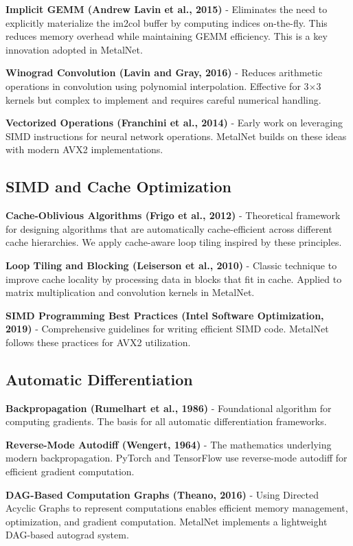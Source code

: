 \documentclass[12pt,oneside,a4paper]{report}
\begin{document}
\textbf{Implicit GEMM (Andrew Lavin et al., 2015)} - Eliminates the need to explicitly materialize the im2col buffer by computing indices on-the-fly. This reduces memory overhead while maintaining GEMM efficiency. This is a key innovation adopted in MetalNet.

\textbf{Winograd Convolution (Lavin and Gray, 2016)} - Reduces arithmetic operations in convolution using polynomial interpolation. Effective for 3$\times$3 kernels but complex to implement and requires careful numerical handling.

\textbf{Vectorized Operations (Franchini et al., 2014)} - Early work on leveraging SIMD instructions for neural network operations. MetalNet builds on these ideas with modern AVX2 implementations.

\subsection{SIMD and Cache Optimization}

\textbf{Cache-Oblivious Algorithms (Frigo et al., 2012)} - Theoretical framework for designing algorithms that are automatically cache-efficient across different cache hierarchies. We apply cache-aware loop tiling inspired by these principles.

\textbf{Loop Tiling and Blocking (Leiserson et al., 2010)} - Classic technique to improve cache locality by processing data in blocks that fit in cache. Applied to matrix multiplication and convolution kernels in MetalNet.

\textbf{SIMD Programming Best Practices (Intel Software Optimization, 2019)} - Comprehensive guidelines for writing efficient SIMD code. MetalNet follows these practices for AVX2 utilization.

\subsection{Automatic Differentiation}

\textbf{Backpropagation (Rumelhart et al., 1986)} - Foundational algorithm for computing gradients. The basis for all automatic differentiation frameworks.

\textbf{Reverse-Mode Autodiff (Wengert, 1964)} - The mathematics underlying modern backpropagation. PyTorch and TensorFlow use reverse-mode autodiff for efficient gradient computation.

\textbf{DAG-Based Computation Graphs (Theano, 2016)} - Using Directed Acyclic Graphs to represent computations enables efficient memory management, optimization, and gradient computation. MetalNet implements a lightweight DAG-based autograd system.
\end{document}

